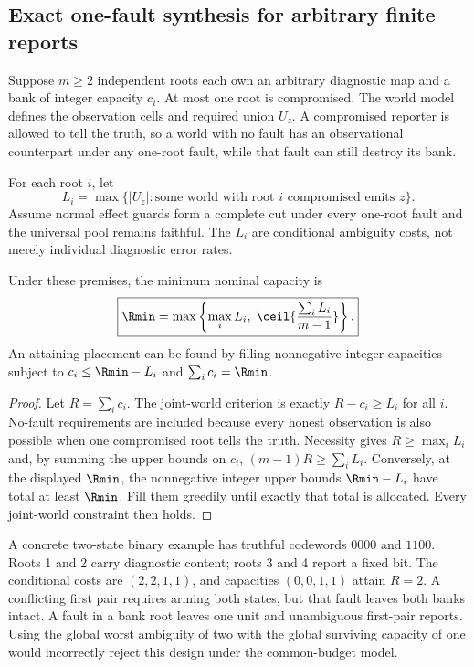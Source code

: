 \subsection{Exact one-fault synthesis for arbitrary finite reports}
Suppose $m\geq2$ independent roots each own an arbitrary diagnostic map and a bank of integer capacity $c_i$. At most one root is compromised. The world model defines the observation cells and required union $U_z$. A compromised reporter is allowed to tell the truth, so a world with no fault has an observational counterpart under any one-root fault, while that fault can still destroy its bank.

For each root $i$, let
\begin{equation}
L_i=\max\{|U_z|:\text{some world with root }i\text{ compromised emits }z\}.
\end{equation}
Assume normal effect guards form a complete cut under every one-root fault and the universal pool remains faithful. The $L_i$ are conditional ambiguity costs, not merely individual diagnostic error rates.

\begin{theorem}
\label{thm:hetero}
Under these premises, the minimum nominal capacity is
\begin{equation}
\boxed{\Rmin=\max\left\{\max_i L_i,\;\ceil{\frac{\sum_i L_i}{m-1}}\right\}.}
\label{eq:hetero}
\end{equation}
An attaining placement can be found by filling nonnegative integer capacities subject to $c_i\leq\Rmin-L_i$ and $\sum_i c_i=\Rmin$.
\end{theorem}
\begin{proof}
Let $R=\sum_i c_i$. The joint-world criterion is exactly $R-c_i\geq L_i$ for all $i$. No-fault requirements are included because every honest observation is also possible when one compromised root tells the truth. Necessity gives $R\geq\max_iL_i$ and, by summing the upper bounds on $c_i$, $(m-1)R\geq\sum_iL_i$. Conversely, at the displayed $\Rmin$, the nonnegative integer upper bounds $\Rmin-L_i$ have total at least $\Rmin$. Fill them greedily until exactly that total is allocated. Every joint-world constraint then holds.
\end{proof}
A concrete two-state binary example has truthful codewords $0000$ and $1100$. Roots 1 and 2 carry diagnostic content; roots 3 and 4 report a fixed bit. The conditional costs are $(2,2,1,1)$, and capacities $(0,0,1,1)$ attain $R=2$. A conflicting first pair requires arming both states, but that fault leaves both banks intact. A fault in a bank root leaves one unit and unambiguous first-pair reports. Using the global worst ambiguity of two with the global surviving capacity of one would incorrectly reject this design under the common-budget model.

